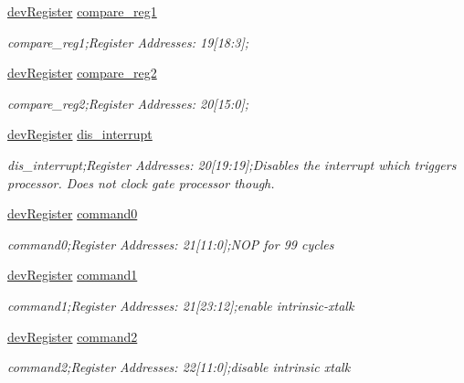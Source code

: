 \begin{DoxyCompactItemize}
\mbox{\hyperlink{classdev_register}{dev\+Register}} \mbox{\hyperlink{class_o_p_t3101_registers_ad8affd7a16707855537343ba9e8fec4a}{compare\+\_\+reg1}}
\begin{DoxyCompactList}\small\item\em compare\+\_\+reg1;Register Addresses\+: 19\mbox{[}18\+:3\mbox{]}; \end{DoxyCompactList}\item 
\mbox{\hyperlink{classdev_register}{dev\+Register}} \mbox{\hyperlink{class_o_p_t3101_registers_a03aff32b62d1dc781221e978696651bb}{compare\+\_\+reg2}}
\begin{DoxyCompactList}\small\item\em compare\+\_\+reg2;Register Addresses\+: 20\mbox{[}15\+:0\mbox{]}; \end{DoxyCompactList}\item 
\mbox{\hyperlink{classdev_register}{dev\+Register}} \mbox{\hyperlink{class_o_p_t3101_registers_afdd0ffaec2b6589f500f059bb54c249e}{dis\+\_\+interrupt}}
\begin{DoxyCompactList}\small\item\em dis\+\_\+interrupt;Register Addresses\+: 20\mbox{[}19\+:19\mbox{]};Disables the interrupt which triggers processor. Does not clock gate processor though. \end{DoxyCompactList}\item 
\mbox{\hyperlink{classdev_register}{dev\+Register}} \mbox{\hyperlink{class_o_p_t3101_registers_a996a3fec72692cb2d83981872a1e2bbf}{command0}}
\begin{DoxyCompactList}\small\item\em command0;Register Addresses\+: 21\mbox{[}11\+:0\mbox{]};N\+OP for 99 cycles \end{DoxyCompactList}\item 
\mbox{\hyperlink{classdev_register}{dev\+Register}} \mbox{\hyperlink{class_o_p_t3101_registers_a0245e363165029a02c847f8a7301da0a}{command1}}
\begin{DoxyCompactList}\small\item\em command1;Register Addresses\+: 21\mbox{[}23\+:12\mbox{]};enable intrinsic-\/xtalk \end{DoxyCompactList}\item 
\mbox{\hyperlink{classdev_register}{dev\+Register}} \mbox{\hyperlink{class_o_p_t3101_registers_aa53e9153cc8a4e8406e582ff3bf192af}{command2}}
\begin{DoxyCompactList}\small\item\em command2;Register Addresses\+: 22\mbox{[}11\+:0\mbox{]};disable intrinsic xtalk \end{DoxyCompactList}\item 

\end{DoxyCompactItemize}
